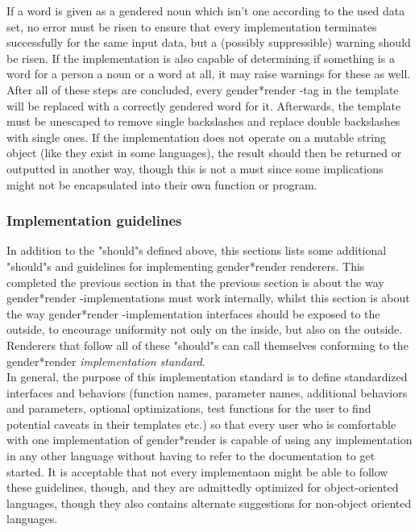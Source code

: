 \documentclass{article}
\newcommand{\GenderRender}{
    gender*render
}
\begin{document}
    If a word is given as a gendered noun which isn't one according to the used data set, no error must be risen to ensure that every implementation terminates successfully for the same input data, but a (possibly suppressible) warning should be risen.
    If the implementation is also capable of determining if something is a word for a person a noun or a word at all, it may raise warnings for these as well.\\

    After all of these steps are concluded, every \GenderRender-tag in the template will be replaced with a correctly gendered word for it.
    Afterwards, the template must be unescaped to remove single backslashes and replace double backslashes with single ones.
    If the implementation does not operate on a mutable string object (like they exist in some languages), the result should then be returned or outputted in another way, though this is not a must since some implications might not be encapsulated into their own function or program.\\

    \subsubsection{Implementation guidelines}

    In addition  to the "should"s defined above, this sections lists some additional "should"s and guidelines for implementing \GenderRender renderers.
    This completed the previous section in that the previous section is about the way \GenderRender-implementations must work internally, whilst this section is about the way \GenderRender-implementation interfaces should be exposed to the outside, to encourage uniformity not only on the inside, but also on the outside.\\
    Renderers that follow all of these "should"s can call themselves conforming to the \GenderRender \emph{implementation standard}.\\

    In general, the purpose of this implementation standard is to define standardized interfaces and behaviors (function names, parameter names, additional behaviors and parameters, optional optimizations, test functions for the user to find potential caveats in their templates etc.) so that every user who is comfortable with one implementation of \GenderRender is capable of using any implementation in any other language without having to refer to the documentation to get started.
    It is acceptable that not every implementaon might be able to follow these guidelines, though, and they are admittedly optimized for object-oriented languages, though they also contains alternate suggestions for non-object oriented languages.\\
\end{document}
